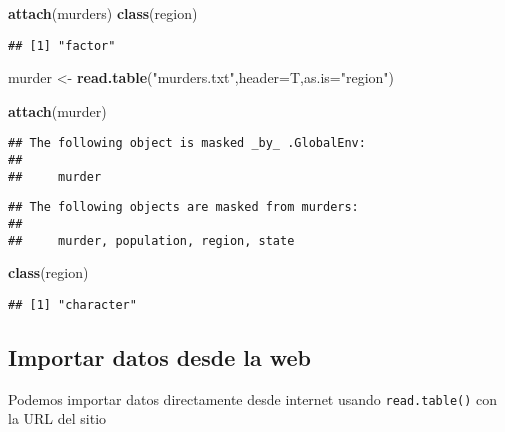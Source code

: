 \documentclass[]{article}
\newenvironment{Shaded}{\begin{snugshade}}{\end{snugshade}}
\newcommand{\KeywordTok}[1]{\textcolor[rgb]{0.13,0.29,0.53}{\textbf{#1}}}
\newcommand{\DataTypeTok}[1]{\textcolor[rgb]{0.13,0.29,0.53}{#1}}
\newcommand{\StringTok}[1]{\textcolor[rgb]{0.31,0.60,0.02}{#1}}
\newcommand{\NormalTok}[1]{#1}
\begin{document}
\begin{Shaded}
\begin{Highlighting}[]
\KeywordTok{attach}\NormalTok{(murders)}
\KeywordTok{class}\NormalTok{(region)}
\end{Highlighting}
\end{Shaded}

\begin{verbatim}
## [1] "factor"
\end{verbatim}

\begin{Shaded}
\begin{Highlighting}[]
\NormalTok{murder <-}\StringTok{ }\KeywordTok{read.table}\NormalTok{(}\StringTok{"murders.txt"}\NormalTok{,}\DataTypeTok{header=}\NormalTok{T,}\DataTypeTok{as.is=}\StringTok{"region"}\NormalTok{)}
\end{Highlighting}
\end{Shaded}

\begin{Shaded}
\begin{Highlighting}[]
\KeywordTok{attach}\NormalTok{(murder)}
\end{Highlighting}
\end{Shaded}

\begin{verbatim}
## The following object is masked _by_ .GlobalEnv:
## 
##     murder
\end{verbatim}

\begin{verbatim}
## The following objects are masked from murders:
## 
##     murder, population, region, state
\end{verbatim}

\begin{Shaded}
\begin{Highlighting}[]
\KeywordTok{class}\NormalTok{(region)}
\end{Highlighting}
\end{Shaded}

\begin{verbatim}
## [1] "character"
\end{verbatim}

\subsection{Importar datos desde la
web}\label{importar-datos-desde-la-web}

Podemos importar datos directamente desde internet usando
\texttt{read.table()} con la URL del sitio
\end{document}
